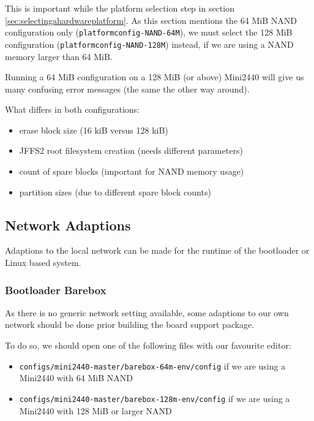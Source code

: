 This is important while the platform selection step in section
\ref{sec:selectingahardwareplatform}.
As this section mentions the 64 MiB NAND configuration only
(\texttt{platformconfig-NAND-64M}), we must select the 128 MiB configuration
(\texttt{platformconfig-NAND-128M}) instead, if we are using a NAND memory
larger than 64 MiB.

\begin{important}
Running a 64 MiB configuration on a 128 MiB (or above) Mini2440 will
give us many confusing error messages (the same the other way around).
\end{important}

What differs in both configurations:
\begin{itemize}
 \item erase block size (16 kiB versus 128 kiB)
 \item JFFS2 root filesystem creation (needs different parameters)
 \item count of spare blocks (important for NAND memory usage)
 \item partition sizes (due to different spare block counts)
\end{itemize}

\subsection{Network Adaptions}		\label{sec:networkadaptions}

Adaptions to the local network can be made for the runtime of the bootloader
or Linux based system.

\subsubsection{Bootloader Barebox}		\label{sec:bootloadernetwork}

As there is no generic network setting available, some adaptions to our own
network should be done prior building the board support package.

To do so, we should open one of the following files with our favourite editor:

\begin{itemize}
 \item \texttt{configs/mini2440-master/barebox-64m-env/config} if we are using
 a Mini2440 with 64 MiB NAND
 \item \texttt{configs/mini2440-master/barebox-128m-env/config} if we are using
 a Mini2440 with 128 MiB or larger NAND
\end{itemize}

